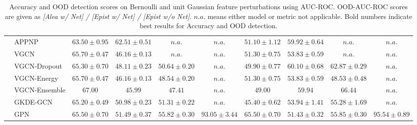 \begin{table*}[!h]
{\begin{tabular}{ll|cccc|cccc}
        & APPNP & ${63.50\scriptscriptstyle \pm 0.95}$ & ${{62.51}\scriptscriptstyle \pm 0.51}$ & $n.a.$ & $n.a.$ & ${51.10\scriptscriptstyle \pm 1.12}$ & ${59.92\scriptscriptstyle \pm 0.64}$ & $n.a.$ & $n.a.$\\
        & VGCN & ${65.70\scriptscriptstyle \pm 0.47}$ & ${46.16\scriptscriptstyle \pm 0.13}$ & $n.a.$ & $n.a.$ & ${51.30\scriptscriptstyle \pm 0.75}$ & ${53.83\scriptscriptstyle \pm 0.59}$ & $n.a.$ & $n.a.$\\
        & VGCN-Dropout & ${65.30\scriptscriptstyle \pm 0.70}$ & ${48.11\scriptscriptstyle \pm 0.23}$ & ${50.64\scriptscriptstyle \pm 0.20}$ & $n.a.$ & ${49.90\scriptscriptstyle \pm 0.77}$ & ${{60.10}\scriptscriptstyle \pm 0.68}$ & ${62.87\scriptscriptstyle \pm 0.29}$ & $n.a.$\\
        & VGCN-Energy & ${65.70\scriptscriptstyle \pm 0.47}$ & ${46.16\scriptscriptstyle \pm 0.13}$ & ${48.54\scriptscriptstyle \pm 0.20}$ & $n.a.$ & ${51.30\scriptscriptstyle \pm 0.75}$ & ${53.83\scriptscriptstyle \pm 0.59}$ & ${48.53\scriptscriptstyle \pm 0.48}$ & $n.a.$\\
        & VGCN-Ensemble & ${\mathbf{67.00}}$ & ${45.99}$ & ${47.41}$ & $n.a.$ & ${49.00}$ & ${59.94}$ & ${{66.44}}$ & $n.a.$\\
        & GKDE-GCN & ${65.20\scriptscriptstyle \pm 0.49}$ & ${50.98\scriptscriptstyle \pm 0.23}$ & ${51.31\scriptscriptstyle \pm 0.22}$ & $n.a.$ & ${45.40\scriptscriptstyle \pm 0.62}$ & ${53.94\scriptscriptstyle \pm 1.41}$ & ${55.28\scriptscriptstyle \pm 1.69}$ & $n.a.$\\
        & GPN & ${65.50\scriptscriptstyle \pm 0.70}$ & ${51.49\scriptscriptstyle \pm 0.37}$ & ${{55.82}\scriptscriptstyle \pm 0.30}$ & ${\mathbf{93.05}\scriptscriptstyle \pm 3.44}$ & ${\mathbf{65.50}\scriptscriptstyle \pm 0.70}$ & ${51.43\scriptscriptstyle \pm 0.32}$ & ${55.85\scriptscriptstyle \pm 0.30}$ & ${\mathbf{95.54}\scriptscriptstyle \pm 0.89}$\\

        \bottomrule
    \end{tabular}}
    \caption{Accuracy and OOD detection scores on Bernoulli and unit Gaussian feature perturbations using AUC-ROC. OOD-AUC-ROC scores are given as \emph{[Alea w/ Net] / [Epist w/ Net] / [Epist w/o Net]}. $n.a.$ means either model or metric not applicable. Bold numbers indicate best results for Accuracy and  OOD detection.}
    \label{tab:isolated_auroc}
\end{table*}



